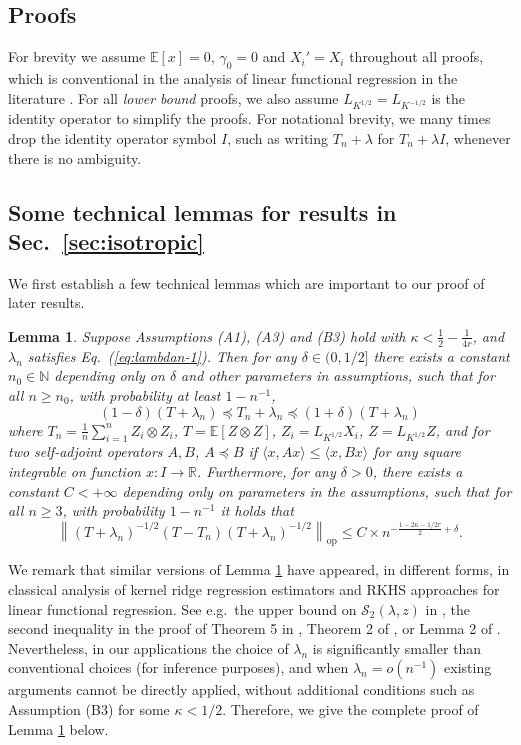 \documentclass[aos]{imsart}
\newcommand{\op}{\mathrm{op}}
\theoremstyle{plain}
\newtheorem{lemma}{Lemma}[section]
\theoremstyle{definition}
\theoremstyle{definition}
\begin{document}
\clearpage
\begin{appendix}
\section{Proofs}\label{app:proofs}

For brevity we assume $\mathbb E[x]=0$, $\gamma_0=0$ and $X_i'=X_i$ throughout all proofs, which is conventional in the analysis of linear functional regression in the literature \citep{cai2012minimax,yuan2010reproducing}.
For all \emph{lower bound} proofs, we also assume $L_{K^{1/2}}=L_{K^{-1/2}}$ is the identity operator to simplify the proofs.
For notational brevity, we many times drop the identity operator symbol $I$, such as writing $T_n+\lambda$ for $T_n+\lambda I$, whenever there is no ambiguity.



\subsection{Some technical lemmas for results in Sec.~\ref{sec:isotropic}}

We first establish a few technical lemmas which are important to our proof of later results.
\begin{lemma}
Suppose Assumptions (A1), (A3) and (B3) hold with $\kappa<\frac{1}{2}-\frac{1}{4r}$, and $\lambda_n$ satisfies Eq.~(\ref{eq:lambdan-1}). Then for any $\delta\in(0,1/2]$ there exists a constant $n_0\in\mathbb N$ depending only on $\delta$ and other parameters in assumptions,
 such that for all $n\geq n_0$, with probability at least $1-n^{-1}$,
$$
(1-\delta)(T+\lambda_n)\preceq T_n+\lambda_n \preceq (1+\delta)(T+\lambda_n)
$$
where $T_n=\frac{1}{n}\sum_{i=1}^n Z_i\otimes Z_i$, $T=\mathbb E[Z\otimes Z]$, $Z_i=L_{K^{1/2}}X_i$, $Z=L_{K^{1/2}}Z$, and for two self-adjoint operators $A,B$, $A\preceq B$ if $\langle x,Ax\rangle\leq \langle x, Bx\rangle$
for any square integrable on function $x:I\to\mathbb R$.
Furthermore, for any $\delta>0$, there exists a constant $C<+\infty$ depending only on parameters in the assumptions, such that for all $n\geq 3$, with probability $1-n^{-1}$ it holds that
$$
\left\|(T+\lambda_n)^{-1/2}(T-T_n)(T+\lambda_n)^{-1/2}\right\|_\op \leq C\times n^{-\frac{1-2\kappa-1/2r}{2}+\delta}.
$$
\label{lem:empirical-population-cov}
\end{lemma}

We remark that similar versions of Lemma \ref{lem:empirical-population-cov} have appeared, in different forms, in classical analysis of kernel ridge regression estimators and RKHS approaches for linear functional regression.
See e.g.~the upper bound on $\mathcal S_2(\lambda,z)$ in \citep{caponnetto2007optimal}, the second inequality in the proof of Theorem 5 in \citep{smale2007learning}, 
Theorem 2 of \citep{hsu2014random},
or Lemma 2 of \citep{cai2012minimax}.
Nevertheless, in our applications the choice of $\lambda_n$ is significantly smaller than conventional choices (for inference purposes), and when $\lambda_n = o(n^{-1})$ existing arguments cannot be directly applied,
without additional conditions such as Assumption (B3) for some $\kappa<1/2$. Therefore, we give the complete proof of Lemma \ref{lem:empirical-population-cov} below.


\end{appendix}
\end{document}
